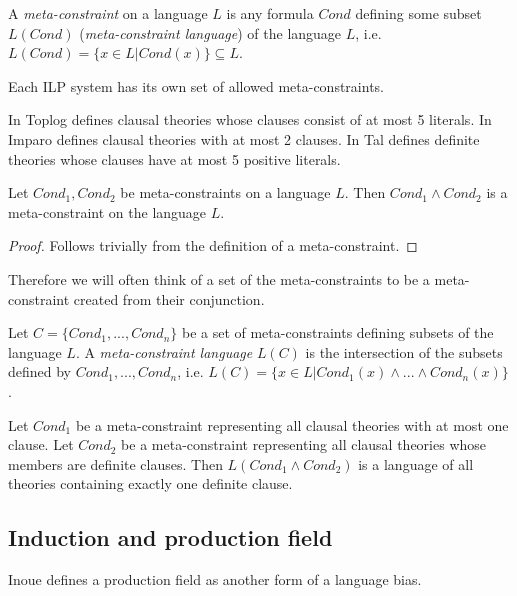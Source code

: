 \begin{defn}
A \emph{meta-constraint} on a language $L$ is any formula $Cond$ defining some subset $L(Cond)$ (\emph{meta-constraint language}) of the language $L$, i.e. $L(Cond)=\{x \in L | Cond(x)\}\subseteq L$.
\end{defn}

Each ILP system has its own set of allowed meta-constraints.
\begin{exmp}
In Toplog  defines clausal theories whose clauses consist of at most 5 literals.
In Imparo  defines clausal theories with at most 2 clauses.
In Tal  defines definite theories whose clauses have at most 5 positive literals.
\end{exmp}

\begin{proposition}
Let $Cond_1, Cond_2$ be meta-constraints on a language $L$.
Then $Cond_1 \land Cond_2$ is a meta-constraint on the language $L$.
\end{proposition}

\begin{proof}
Follows trivially from the definition of a meta-constraint.
\end{proof}

Therefore we will often think of a set of the meta-constraints to be a meta-constraint created from their conjunction.

\begin{defn}
Let $C=\{Cond_1, ..., Cond_n\}$ be a set of meta-constraints defining subsets of the language $L$.
A \emph{meta-constraint language} $L(C)$ is the intersection of the subsets defined by $Cond_1, ..., Cond_n$,
i.e. $L(C)=\{x \in L | Cond_1(x) \land ... \land Cond_n(x) \}$.
\end{defn}

\begin{exmp}
Let $Cond_1$ be a meta-constraint representing all clausal theories with at most one clause. Let $Cond_2$ be a meta-constraint representing all clausal theories whose members are definite clauses. Then $L(Cond_1 \land Cond_2)$ is a language of all theories containing exactly one definite clause.
\end{exmp}

\subsection{Induction and production field}
Inoue defines a production field as another form of a language bias.

